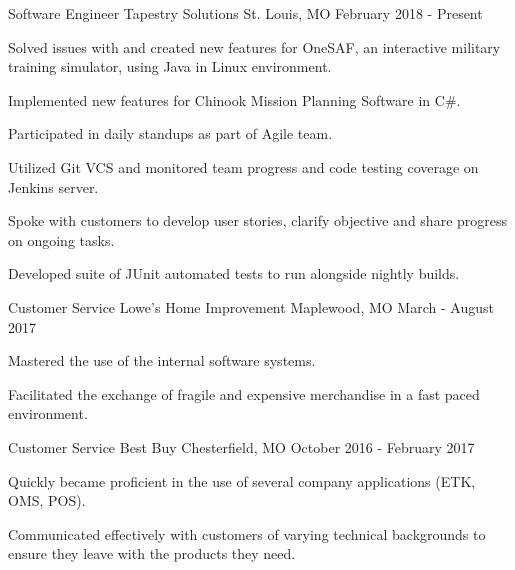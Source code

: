 

\begin{cventries}


  \cventry
    {Software Engineer} %
    {Tapestry Solutions} %
    {St. Louis, MO} %
    {February 2018 - Present} %
    {
      \begin{cvitems} %
        \item {Solved issues with and created new features for OneSAF, an interactive military training simulator, using Java in Linux environment.}
        \item {Implemented new features for Chinook Mission Planning Software in C#.}
        \item {Participated in daily standups as part of Agile team.}
        \item {Utilized Git VCS and monitored team progress and code testing coverage on Jenkins server.}
        \item {Spoke with customers to develop user stories, clarify objective and share progress on ongoing tasks.}
        \item {Developed suite of JUnit automated tests to run alongside nightly builds.}
      \end{cvitems}
    }

  \cventry
    {Customer Service} %
    {Lowe's Home Improvement} %
    {Maplewood, MO} %
    {March - August 2017} %
    {
      \begin{cvitems} %
        \item {Mastered the use of the internal software systems.}
        \item {Facilitated the exchange of fragile and expensive merchandise in a fast paced environment.}
      \end{cvitems}
    }

  \cventry
    {Customer Service} %
    {Best Buy} %
    {Chesterfield, MO} %
    {October 2016 - February 2017} %
    {
      \begin{cvitems} %
        \item {Quickly became proficient in the use of several company applications (ETK, OMS, POS).}
        \item {Communicated effectively with customers of varying technical backgrounds to ensure they leave with the products they need.}
      \end{cvitems}
    }

\end{cventries}
